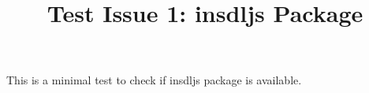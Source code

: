 \documentclass{article}
\begin{document}
\title{Test Issue 1: insdljs Package}
\maketitle

This is a minimal test to check if insdljs package is available.
\end{document}
